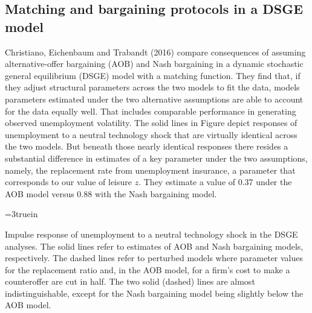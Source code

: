 \subsection{Matching and bargaining protocols in a  DSGE model}
Christiano, Eichenbaum and Trabandt (2016) compare consequences
of assuming
alternative-offer bargaining (AOB) and Nash bargaining
in a dynamic stochastic general equilibrium (DSGE)
model with a matching function. They find that,  if they adjust structural parameters across the two models  to  fit the  data,
 models parameters estimated under   the two alternative assumptions are  able to account for
the data equally well. That  includes comparable performance in   generating observed  unemployment volatility.
The solid lines in Figure 
depict responses of unemployment to a neutral technology
shock that are virtually identical across the two models.
But  beneath those nearly identical responses there resides  a substantial difference in estimates of a key parameter under
the two assumptions, namely,
the replacement rate from unemployment insurance, a parameter that
corresponds to our value of leisure $z$. They estimate a value of  0.37 under the AOB
model versus 0.88 with the Nash bargaining model.
%




\centerline{\epsfxsize=3truein}
\caption{Impulse response of unemployment to a neutral
technology shock in the DSGE analyses. The solid lines refer
to estimates of   AOB and Nash bargaining models,
respectively. The
dashed lines refer to perturbed models where parameter
values for the replacement ratio and,  in the AOB model,
for a firm's cost to make a counteroffer are cut in half. The
two solid (dashed) lines are almost indistinguishable, except for the Nash bargaining model being slightly below
the AOB model.}
\endfigure


